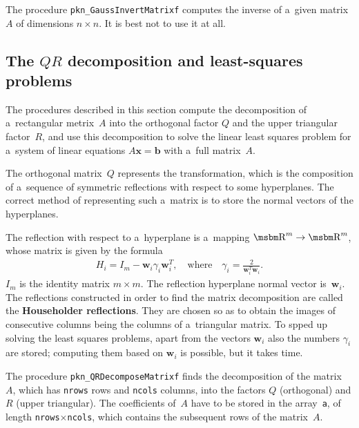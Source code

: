 \vspace{\bigskipamount}
The procedure \texttt{pkn\_GaussInvertMatrixf} computes the inverse of
a~given matrix~$A$ of dimensions $n\times n$. It is best not to use it at
all.


\newpage
\subsection{\label{ssect:QR}The $QR$ decomposition and least-squares problems}

The procedures described in this section compute the decomposition of
a~rectangular metrix~$A$ into the orthogonal factor $Q$ and the upper
triangular factor~$R$, and use this decomposition to solve the
linear least squares problem for a~system of linear equations
$A\bm{x}=\bm{b}$ with a~full matrix~$A$.

The orthogonal matrix~$Q$ represents the transformation, which is the
composition of a~sequence of symmetric reflections with respect to some
hyperplanes. The correct method of representing such a~matrix is to
store the normal vectors of the hyperplanes.

The reflection with respect to a~hyperplane is a~mapping
$\R^m\rightarrow\R^m$, whose matrix is given by the formula
\begin{align*}
H_i = I_m-\bm{w}_i\gamma_i\bm{w}_i^T,
\quad\mbox{where}\quad
  \gamma_i = \frac{2}{\bm{w}_i^T\bm{w}_i}.
\end{align*}
$I_m$ is the identity matrix $m\times m$. The reflection hyperplane normal
vector is~$\bm{w}_i$. The reflections constructed in order to find the matrix
decomposition are called the \textbf{Householder reflections}. They are
chosen so as to obtain the images of consecutive columns being the columns
of a~triangular matrix. To spped up solving the least squares problems,
apart from the vectors $\bm{w}_i$ also the numbers $\gamma_i$ are stored;
computing them based on $\bm{w}_i$ is possible, but it takes time.

\vspace{\bigskipamount}
The procedure \texttt{pkn\_QRDecomposeMatrixf} finds the decomposition
of the matrix~$A$, which has \texttt{nrows} rows and \texttt{ncols} columns,
into the factors $Q$ (orthogonal) and $R$ (upper triangular).
The coefficients of~$A$ have to be stored in the array~\texttt{a},
of length \texttt{nrows}$\times$\texttt{ncols}, which contains the subsequent
rows of the matrix~$A$.

